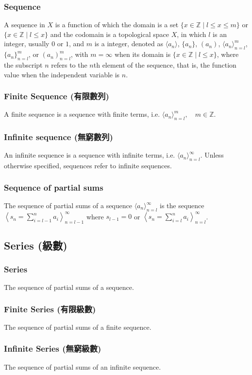 \subsubsection{Sequence}
A sequence in $X$ is a function of which the domain is a set $\{x\in\mathbb{Z}\mid l\leq x\leq m\}$ or $\{x\in\mathbb{Z}\mid l\leq x\}$ and the codomain is a topological space $X$, in which $l$ is an integer, usually $0$ or $1$, and $m$ is a integer, denoted as $\langle a_n\rangle$, $\{a_n\}$, $(a_n)$, $\langle a_n\rangle_{n=l}^m$, $\{a_n\}_{n=l}^m$, or $(a_n)_{n=l}^m$, with $m=\infty$ when its domain is $\{x\in\mathbb{Z}\mid l\leq x\}$, where the subscript $n$ refers to the $n$th element of the sequence, that is, the function value when the  independent variable is $n$.
\subsubsection{Finite Sequence (有限數列)}
A finite sequence is a sequence with finite terms, i.e. $\langle a_n\rangle_{n=l}^m,\quad m\in\mathbb{Z}$.
\subsubsection{Infinite sequence (無窮數列)}
An infinite sequence is a sequence with infinite terms, i.e. $\langle a_n\rangle_{n=l}^\infty$. Unless otherwise specified, sequences refer to infinite sequences.
\subsubsection{Sequence of partial sums}
The sequence of partial sums of a sequence $\langle a_n\rangle_{n=l}^{\infty}$ is the sequence $\left\langle s_n=\sum_{i=l-1}^na_i\right\rangle_{n=l-1}^{\infty}$ where $s_{l-1}=0$ or $\left\langle s_n=\sum_{i=l}^na_i\right\rangle_{n=l}^{\infty}$.
\subsection{Series (級數)}
\subsubsection{Series}
The sequence of partial sums of a sequence.
\subsubsection{Finite Series (有限級數)}
The sequence of partial sums of a finite sequence.
\subsubsection{Infinite Series (無窮級數)}
The sequence of partial sums of an infinite sequence.
